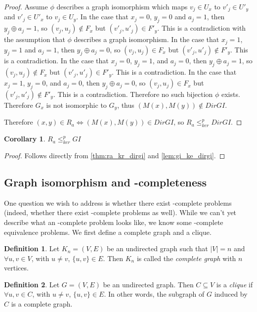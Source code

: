 \documentclass{amsart}
\newtheorem{corollary}[corollary]{Corollary}
\theoremstyle{definition} \newtheorem{definition}[definition]{Definition}
\newcommand{\kr}{\leq^{p}_{ker}} %
\newcommand{\defn}[1]{\emph{#1}} %
\begin{document}
\begin{proof}
  Assume $\phi$ describes a graph isomorphism which maps $v_j\in U_x$ to
  $v'_j\in U'_y$ and $v'_j\in U'_x$ to $v_j\in U_y$. In the case that $x_j=0$,
  $y_j=0$ and $a_j=1$, then $y_j\oplus a_j=1$, so $(v_j, u_j)\notin F_x$ but
  $(v'_j, u'_j)\in F'_y$. This is a contradiction with the assumption that
  $\phi$ describes a graph isomorphism. In the case that $x_j=1$, $y_j=1$ and
  $a_j=1$, then $y_j\oplus a_j=0$, so $(v_j, u_j)\in F_x$ but $(v'_j,
  u'_j)\notin F'_y$. This is a contradiction. In the case that $x_j=0$,
  $y_j=1$, and $a_j=0$, then $y_j\oplus a_j=1$, so $(v_j, u_j)\notin F_x$ but
  $(v'_j, u'_j)\in F'_y$. This is a contradiction. In the case that $x_j=1$,
  $y_j=0$, and $a_j=0$, then $y_j\oplus a_j=0$, so $(v_j, u_j)\in F_x$ but
  $(v'_j, u'_j)\notin F'_y$. This is a contradiction. Therefore no such
  bijection $\phi$ exists. Therefore $G_x$ is not isomorphic to $G_y$, thus
  $(M(x), M(y))\notin DirGI$.

  Therefore $(x, y)\in R_a\iff (M(x), M(y))\in DirGI$, so $R_a\kr DirGI$.
\end{proof}

\begin{corollary}$R_a\kr GI$\end{corollary}
\begin{proof}Follows directly from \autoref{thm:ra_kr_dirgi} and
  \autoref{lem:gi_ke_dirgi}.\end{proof}

\subsection{Graph isomorphism and \texorpdfstring{\NPEq}{NPEq}-completeness}

One question we wish to address is whether there exist \NPEq-complete problems
(indeed, whether there exist \PEq-complete problems as well). While we can't
yet describe what an \NPEq-complete problem looks like, we know some
\NP-complete equivalence problems. We first define a complete graph and a
clique.

\begin{definition}
  Let $K_n=(V, E)$ be an undirected graph such that $|V|=n$ and $\forall u,v\in
  V$, with $u\neq v$, $\{u,v\}\in E$. Then $K_n$ is called the \defn{complete
    graph} with $n$ vertices.
\end{definition}
\begin{definition}
  Let $G=(V,E)$ be an undirected graph. Then $C\subseteq V$ is a \defn{clique}
  if $\forall u,v\in C$, with $u\neq v$, $\{u, v\}\in E$. In other words, the
  subgraph of $G$ induced by $C$ is a complete graph.
\end{definition}
\end{document}
